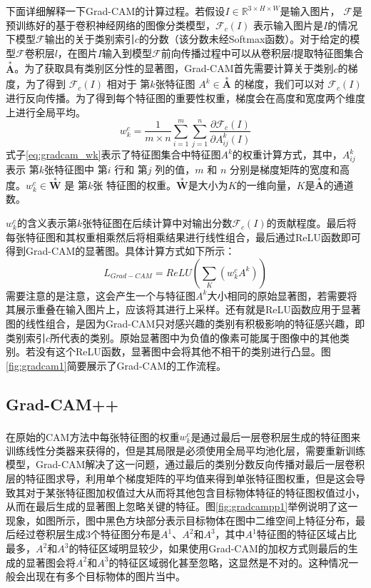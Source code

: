 下面详细解释一下Grad-CAM的计算过程。若假设$I \in \mathbb{R}^{3\times H \times W}$是输入图片， $\mathcal{F}$是预训练好的基于卷积神经网络的图像分类模型，$\mathcal{F}_c(I)$ 表示输入图片是$I$的情况下模型$\mathcal{F}$输出的关于类别索引$c$的分数（该分数未经Softmax函数）。对于给定的模型$\mathcal{F}$卷积层$l$，在图片$I$输入到模型$\mathcal{F}$前向传播过程中可以从卷积层$l$提取特征图集合$\overset{*}{\bm{A}}$。为了获取具有类别区分性的显著图，Grad-CAM首先需要计算关于类别$c$的梯度，为了得到 $\mathcal{F}_c(I)$ 相对于 第$k$张特征图 $A^k \in \overset{*}{\bm{A}}$ 的梯度，我们可以对 $\mathcal{F}_c(I)$ 进行反向传播。为了得到每个特征图的重要性权重，梯度会在高度和宽度两个维度上进行全局平均。
\begin{equation}
	w^c_k=\frac{1}{m\times n}\sum_{i=1}^{m}\sum_{j=1}^{n}\frac{\partial \mathcal{F}_c(I)}{\partial A_{ij}^k(I)}
	\label{eq:gradcam_wk}
\end{equation}
式子\ref{eq:gradcam_wk}表示了特征图集合中特征图$A^k$的权重计算方式，其中，$A_{ij}^k$ 表示 第$k$张特征图中 第$i$ 行和 第$j$ 列的值，$m$ 和 $n$ 分别是梯度矩阵的宽度和高度。$w^c_k \in \overset{*}{\bm{W}}$ 是 第$k$张 特征图的权重。$\overset{*}{\bm{W}}$是大小为$K$的一维向量，$K$是$\overset{*}{\bm{A}}$的通道数。


$w^c_k $的含义表示第$k$张特征图在后续计算中对输出分数$\mathcal{F}_c(I)$的贡献程度。最后将每张特征图和其权重相乘然后将相乘结果进行线性组合，最后通过ReLU函数即可得到Grad-CAM的显著图。具体计算方式如下所示：
\begin{equation}
	L_{Grad-CAM}=ReLU(\sum_K(w^c_k A^k))
	\label{eq:gradcam}
\end{equation}
需要注意的是注意，这会产生一个与特征图$A^k$大小相同的原始显著图，若需要将其展示重叠在输入图片上，应该将其进行上采样。还有就是ReLU函数应用于显著图的线性组合，是因为Grad-CAM只对感兴趣的类别有积极影响的特征感兴趣，即类别索引$c$所代表的类别。原始显著图中为负值的像素可能属于图像中的其他类别。若没有这个ReLU函数，显著图中会将其他不相干的类别进行凸显。图\ref{fig:gradcam1}简要展示了Grad-CAM的工作流程。

\subsection{Grad-CAM++}
在原始的CAM\textsuperscript{\cite{zhou2016learning}}方法中每张特征图的权重$w^c_k$是通过最后一层卷积层生成的特征图来训练线性分类器来获得的，但是其局限是必须使用全局平均池化层，需要重新训练模型，Grad-CAM解决了这一问题，通过最后的类别分数反向传播对最后一层卷积层的特征图求导，利用单个梯度矩阵的平均值来得到单张特征图权重，但是这会导致其对于某张特征图加权值过大从而将其他包含目标物体特征的特征图权值过小，从而在最后生成的显著图上忽略关键的特征。图\ref{fig:gradcampp1}举例说明了这一现象，如图所示，图中黑色方块部分表示目标物体在图中二维空间上特征分布，最后经过卷积层生成3个特征图分布是$A^1$、$A^2$和$A^3$，其中$A^1$特征图的特征区域占比最多，$A^2$和$A^3$的特征区域明显较少，如果使用Grad-CAM的加权方式则最后的生成的显著图会将$A^2$和$A^3$的特征区域弱化甚至忽略，这显然是不对的。这种情况一般会出现在有多个目标物体的图片当中。

